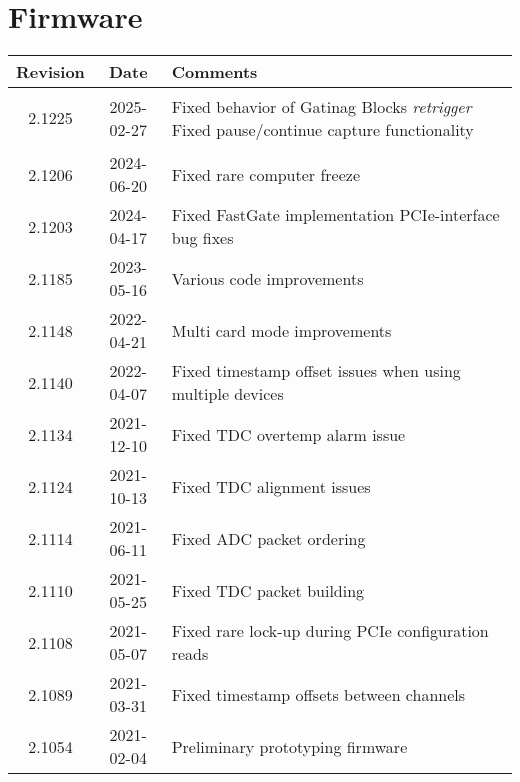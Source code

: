 \section{Firmware} \label{sec:firmware}\mbox{}
\begin{tabularx}{\textwidth}{|c|c|X|}
    \hline
    Revision & Date & Comments\\
    \hline\hline
	\hypertarget{fwrev}{2.1225} & 2025-02-27 &
		Fixed behavior of Gatinag Blocks \textit{retrigger}\newline
		Fixed pause/continue capture functionality
	\\
	\hline
	2.1206 & 2024-06-20 & Fixed rare computer freeze\\
	\hline
	2.1203 & 2024-04-17 &
		Fixed FastGate implementation\newline
		PCIe-interface bug fixes
	\\
	\hline
	2.1185 & 2023-05-16 & Various code improvements\\
	\hline
	2.1148 & 2022-04-21 & Multi card mode improvements\\
	\hline
	2.1140 & 2022-04-07 & Fixed timestamp offset issues when using multiple devices\\
	\hline
	2.1134 & 2021-12-10 & Fixed TDC overtemp alarm issue\\
	\hline
	2.1124 & 2021-10-13 & Fixed TDC alignment issues\\
	\hline
	2.1114 & 2021-06-11 & Fixed ADC packet ordering\\
	\hline
	2.1110 & 2021-05-25 & Fixed TDC packet building\\
	\hline
	2.1108 & 2021-05-07 & Fixed rare lock-up during PCIe configuration reads\\
	\hline
	2.1089 & 2021-03-31 & Fixed timestamp offsets between channels\\
	\hline
    2.1054 & 2021-02-04 & Preliminary prototyping firmware\\
    \hline
\end{tabularx}
